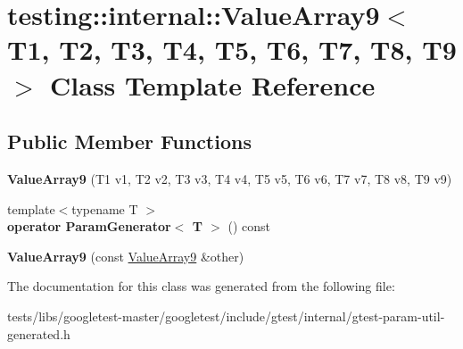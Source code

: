 \hypertarget{classtesting_1_1internal_1_1ValueArray9}{}\section{testing\+:\+:internal\+:\+:Value\+Array9$<$ T1, T2, T3, T4, T5, T6, T7, T8, T9 $>$ Class Template Reference}
\label{classtesting_1_1internal_1_1ValueArray9}
\subsection*{Public Member Functions}
\begin{DoxyCompactItemize}
\item 
\mbox{\label{classtesting_1_1internal_1_1ValueArray9_a4985545b509dc5d7db659cd31b110c21}} 
{\bfseries Value\+Array9} (T1 v1, T2 v2, T3 v3, T4 v4, T5 v5, T6 v6, T7 v7, T8 v8, T9 v9)
\item 
\mbox{\label{classtesting_1_1internal_1_1ValueArray9_aede7e5849cfab0504c49673d5c5c4cce}} 
{\footnotesize template$<$typename T $>$ }\\{\bfseries operator Param\+Generator$<$ T $>$} () const
\item 
\mbox{\label{classtesting_1_1internal_1_1ValueArray9_ab251d9c7a0df5c8034ecda38eadd030a}} 
{\bfseries Value\+Array9} (const \hyperlink{classtesting_1_1internal_1_1ValueArray9}{Value\+Array9} \&other)
\end{DoxyCompactItemize}


The documentation for this class was generated from the following file\+:\begin{DoxyCompactItemize}
\item 
tests/libs/googletest-\/master/googletest/include/gtest/internal/gtest-\/param-\/util-\/generated.\+h\end{DoxyCompactItemize}
